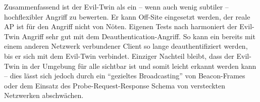 Zusammenfassend ist der Evil-Twin als ein -- wenn auch wenig subtiler -- hochflexibler Angriff zu bewerten. Er kann Off-Site eingesetzt werden, der reale AP ist für den Angriff nicht von Nöten.
Eigenen Tests nach harmoniert der Evil-Twin Angriff sehr gut mit dem Deauthentication-Angriff.
So kann ein bereits mit einem anderen Netzwerk verbundener Client so lange deauthentifiziert werden, bis er sich mit dem Evil-Twin verbindet.
Einziger Nachteil bleibt, dass der Evil-Twin in der Umgebung für alle sichtbar ist und somit leicht erkannt werden kann -- dies lässt sich jedoch durch ein \enquote{gezieltes Broadcasting} von Beacon-Frames oder dem Einsatz des Probe-Request-Response Schema von versteckten Netzwerken abschwächen.


